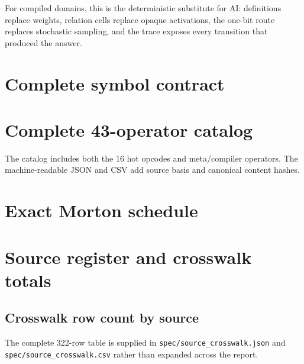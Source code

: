 \documentclass[11pt,a4paper]{article}
\newcommand{\code}[1]{\texttt{#1}}
\begin{document}
For compiled domains, this is the deterministic substitute for AI: definitions replace weights, relation cells replace opaque activations, the one-bit route replaces stochastic sampling, and the trace exposes every transition that produced the answer.

\clearpage
\appendix
\section{Complete symbol contract}


\clearpage
\section{Complete 43-operator catalog}
The catalog includes both the 16 hot opcodes and meta/compiler operators. The machine-readable JSON and CSV add source basis and canonical content hashes.


\clearpage
\section{Exact Morton schedule}


\clearpage
\section{Source register and crosswalk totals}


\subsection*{Crosswalk row count by source}
\begin{center}

\end{center}
The complete 322-row table is supplied in \code{spec/source\_crosswalk.json} and \code{spec/source\_crosswalk.csv} rather than expanded across the report.

\clearpage
\end{document}
